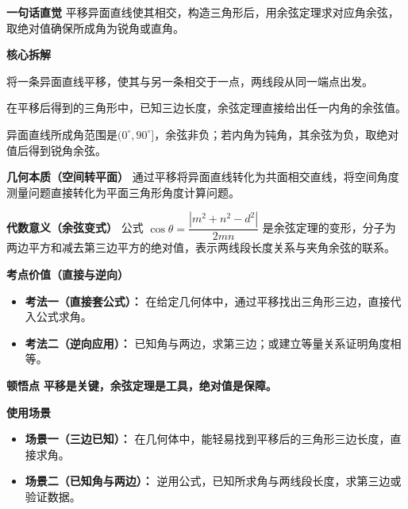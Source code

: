 \begin{explanationbox}
	\textbf{\textcolor{CExplanation}{一句话直觉}}
	平移异面直线使其相交，构造三角形后，用余弦定理求对应角余弦，取绝对值确保所成角为锐角或直角。

	\medskip
	\textbf{\textcolor{CExplanation}{核心拆解}}
	\begin{description}[style=nextline, leftmargin=2.8em, labelsep=0.5em, itemsep=0.45em]
		\item[\textbf{要点一（平移共起点）：}]
			将一条异面直线平移，使其与另一条相交于一点，两线段从同一端点出发。
		\item[\textbf{要点二（余弦定理）：}]
			在平移后得到的三角形中，已知三边长度，余弦定理直接给出任一内角的余弦值。
		\item[\textbf{要点三（绝对值取锐角）：}]
			异面直线所成角范围是$(0^\circ,90^\circ]$，余弦非负；若内角为钝角，其余弦为负，取绝对值后得到锐角余弦。
	\end{description}

	\medskip
	\textbf{\textcolor{CExplanation}{几何本质（空间转平面）}}
	通过平移将异面直线转化为共面相交直线，将空间角度测量问题直接转化为平面三角形角度计算问题。

	\medskip
	\textbf{\textcolor{CExplanation}{代数意义（余弦变式）}}
	公式 $\cos\theta = \dfrac{|m^2+n^2-d^2|}{2mn}$ 是余弦定理的变形，分子为两边平方和减去第三边平方的绝对值，表示两线段长度关系与夹角余弦的联系。

	\medskip
	\textbf{\textcolor{CExplanation}{考点价值（直接与逆向）}}
	\begin{itemize}[leftmargin=*, itemsep=0.5em, topsep=0.4em]
		\item \textbf{考法一（直接套公式）：} 在给定几何体中，通过平移找出三角形三边，直接代入公式求角。
		\item \textbf{考法二（逆向应用）：} 已知角与两边，求第三边；或建立等量关系证明角度相等。
	\end{itemize}

	\medskip
	\textbf{\textcolor{CExplanation}{顿悟点}}
	\textbf{平移是关键，余弦定理是工具，绝对值是保障。}

	\medskip
	\textbf{\textcolor{CExplanation}{使用场景}}
	\begin{itemize}[leftmargin=*, itemsep=0.5em, topsep=0.4em]
		\item \textbf{场景一（三边已知）：} 在几何体中，能轻易找到平移后的三角形三边长度，直接求角。
		\item \textbf{场景二（已知角与两边）：} 逆用公式，已知所求角与两线段长度，求第三边或验证数据。
	\end{itemize}

\end{explanationbox}
